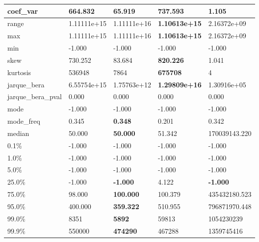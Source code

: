 \begin{table}[H]
\begin{tabular}{|l|m{10em}|m{10em}|m{10em}|m{10em}|}
\hline coef\_var & 664.832 & 65.919 & \bfseries 737.593 & \cellcolor[rgb]{0.9, 0.54, 0.52} 1.105 \\
\hline range & 1.11111e+15 & \cellcolor[rgb]{0.9, 0.54, 0.52} 1.11111e+16 & \bfseries 1.10613e+15 & 2.16372e+09 \\
\hline max & 1.11111e+15 & \cellcolor[rgb]{0.9, 0.54, 0.52} 1.11111e+16 & \bfseries 1.10613e+15 & 2.16372e+09 \\
\hline min & -1.000 & -1.000 & -1.000 & -1.000 \\
\hline skew & 730.252 & 83.684 & \bfseries 820.226 & \cellcolor[rgb]{0.9, 0.54, 0.52} 1.041 \\
\hline kurtosis & 536948 & 7864 & \bfseries 675708 & \cellcolor[rgb]{0.9, 0.54, 0.52} 4 \\
\hline jarque\_bera & 6.55754e+15 & 1.75763e+12 & \bfseries 1.29809e+16 & \cellcolor[rgb]{0.9, 0.54, 0.52} 1.30916e+05 \\
\hline jarque\_bera\_pval & 0.000 & 0.000 & 0.000 & 0.000 \\
\hline mode & -1.000 & -1.000 & -1.000 & -1.000 \\
\hline mode\_freq & 0.345 & \bfseries 0.348 & \cellcolor[rgb]{0.9, 0.54, 0.52} 0.201 & 0.342 \\
\hline median & 50.000 & \bfseries 50.000 & 51.342 & \cellcolor[rgb]{0.9, 0.54, 0.52} 170039143.220 \\
\hline 0.1\% & -1.000 & -1.000 & -1.000 & -1.000 \\
\hline 1.0\% & -1.000 & -1.000 & -1.000 & -1.000 \\
\hline 5.0\% & -1.000 & -1.000 & -1.000 & -1.000 \\
\hline 25.0\% & -1.000 & \bfseries -1.000 & \cellcolor[rgb]{0.9, 0.54, 0.52} 4.122 & \bfseries -1.000 \\
\hline 75.0\% & 98.000 & \bfseries 100.000 & 100.379 & \cellcolor[rgb]{0.9, 0.54, 0.52} 435432180.523 \\
\hline 95.0\% & 400.000 & \bfseries 359.322 & 510.955 & \cellcolor[rgb]{0.9, 0.54, 0.52} 796871970.448 \\
\hline 99.0\% & 8351 & \bfseries 5892 & 59813 & \cellcolor[rgb]{0.9, 0.54, 0.52} 1054230239 \\
\hline 99.9\% & 550000 & \bfseries 474290 & 467288 & \cellcolor[rgb]{0.9, 0.54, 0.52} 1359745416 \\
\hline
\end{tabular}
\end{table}
